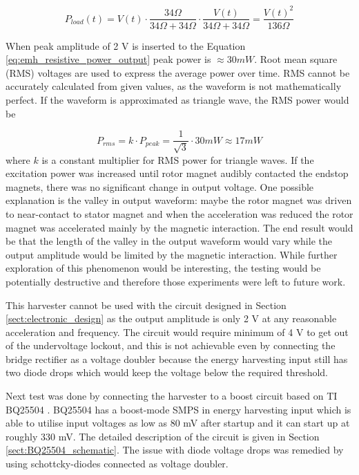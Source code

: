 \begin{equation}\label{eq:emh_resistive_power_output}
  P_{load}(t) = V(t) \cdot \frac{ 34 \Omega }{ 34 \Omega + 34 \Omega } \cdot \frac{ V(t) }{ 34 \Omega + 34 \Omega } = \frac{V(t)^2}{136 \Omega}
\end{equation}

When peak amplitude of 2 V is inserted to the Equation \eqref{eq:emh_resistive_power_output} peak power is $ \approx 30 mW $. Root mean square (RMS) voltages are used to express the average power over time. RMS cannot be accurately calculated from given values, as the waveform is not  mathematically perfect. If the waveform is approximated as triangle wave, the RMS power would be 

\begin{equation} \label{eq:rms_power}
  P_{rms} = k \cdot P_{peak} = \frac{1}{\sqrt{3}} \cdot 30 mW \approx 17 mW 
\end{equation}
where $k$ is a constant multiplier for RMS power for triangle waves. 
If the excitation power was increased until rotor magnet audibly contacted the endstop magnets, there was no significant change in output voltage. One possible explanation is the valley in output waveform: maybe the rotor magnet was driven to near-contact to stator magnet and when the acceleration was reduced the rotor magnet was accelerated mainly by the magnetic interaction. The end result would be that the length of the valley in the output waveform would vary while the output amplitude would be limited by the magnetic interaction. While further exploration of this phenomenon would be interesting, the testing would be potentially destructive and therefore those experiments were left to future work.

This harvester cannot be used with the circuit designed in Section \ref{sect:electronic_design} as the output amplitude is only 2 V at any reasonable acceleration and frequency. The circuit would require minimum of 4 V to get out of the undervoltage lockout, and this is not achievable even by connecting the bridge rectifier as a voltage doubler because the energy harvesting input still has two diode drops which would keep the voltage below the required threshold.

Next test was done by connecting the harvester to a boost circuit based on TI BQ25504 \cite{bq25504}. BQ25504 has a boost-mode SMPS in energy harvesting input which is able to utilise input voltages as low as 80 mV after startup and it can start up at roughly 330 mV. The detailed description of the circuit is given in Section \ref{sect:BQ25504_schematic}. The issue with diode voltage drops was remedied by using schottcky-diodes connected as voltage doubler.

